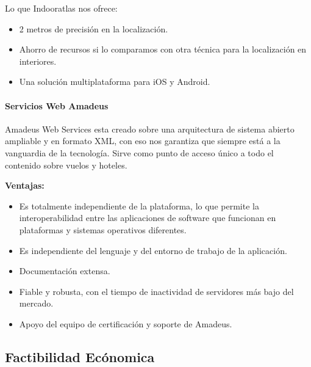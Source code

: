 Lo que Indooratlas nos ofrece:

\begin{itemize}
	\item 2 metros de precisión en la localización.
	\item	Ahorro de recursos si lo comparamos con otra técnica para la localización en interiores.
	\item Una solución multiplataforma para iOS y Android.
\end{itemize}

\paragraph{Servicios Web Amadeus}
 
Amadeus Web Services esta creado sobre una arquitectura de sistema abierto ampliable y en formato XML, con eso nos garantiza que siempre está a la vanguardia de la tecnología. Sirve como punto de acceso único a todo el contenido sobre vuelos y hoteles.
  
\textbf{Ventajas:}
\begin{itemize}
	\item Es totalmente independiente de la plataforma, lo que permite la interoperabilidad entre las aplicaciones de software que funcionan en plataformas y sistemas operativos diferentes.
	\item Es independiente del lenguaje y del entorno de trabajo de la aplicación.
	\item 	Documentación extensa.
	\item Fiable y robusta, con el tiempo de inactividad de servidores más bajo del mercado.
	\item Apoyo del equipo de certificación y soporte de Amadeus.
\end{itemize}

\subsection{Factibilidad Ecónomica}

